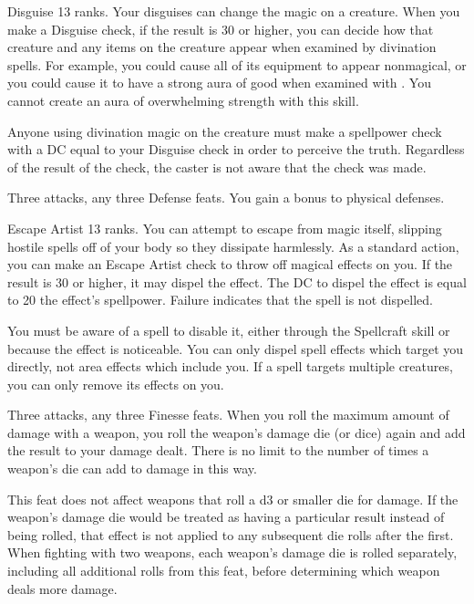 \featpre Disguise 13 ranks.
\featben Your disguises can change the magic on a creature.
When you make a Disguise check, if the result is 30 or higher, you can decide how that creature and any items on the creature appear when examined by divination spells.
For example, you could cause all of its equipment to appear nonmagical, or you could cause it to have a strong aura of good when examined with .
You cannot create an aura of overwhelming strength with this skill.

Anyone using divination magic on the creature must make a spellpower check with a DC equal to your Disguise check in order to perceive the truth.
Regardless of the result of the check, the caster is not aware that the check was made.

\featpres Three attacks, any three Defense feats.
\featben You gain a  bonus to physical defenses.

\featpre Escape Artist 13 ranks.
\featben You can attempt to escape from magic itself, slipping hostile spells off of your body so they dissipate harmlessly.
As a standard action, you can make an Escape Artist check to throw off magical effects on you.
If the result is 30 or higher, it may dispel the effect.
The DC to dispel the effect is equal to 20 \add the effect's spellpower.
Failure indicates that the spell is not dispelled.

You must be aware of a spell to disable it, either through the Spellcraft skill or because the effect is noticeable.
You can only dispel spell effects which target you directly, not area effects which include you.
If a spell targets multiple creatures, you can only remove its effects on you.

\featpres Three attacks, any three Finesse feats.
\featben When you roll the maximum amount of damage with a weapon, you roll the weapon's damage die (or dice) again and add the result to your damage dealt.
There is no limit to the number of times a weapon's die can add to damage in this way.

This feat does not affect weapons that roll a d3 or smaller die for damage.
If the weapon's damage die would be treated as having a particular result instead of being rolled, that effect is not applied to any subsequent die rolls after the first.
When fighting with two weapons, each weapon's damage die is rolled separately, including all additional rolls from this feat, before determining which weapon deals more damage.

